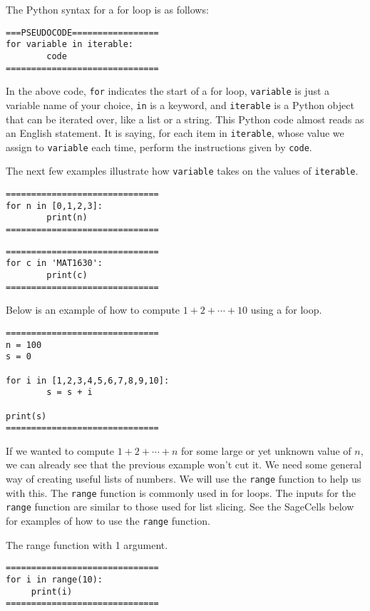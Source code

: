 \documentclass{ximera}
\begin{document}
The Python syntax for a for loop is as follows:

\begin{verbatim}
===PSEUDOCODE=================
for variable in iterable:
        code
==============================
\end{verbatim}

In the above code, \verb|for| indicates the start of a for loop, \verb|variable| is just a variable name of your choice, \verb|in| is a keyword, and \verb|iterable| is a Python object that can be iterated over, like a list or a string. This Python code almost reads as an English statement. It is saying, for each item in \verb|iterable|, whose value we assign to \verb|variable| each time, perform the instructions given by \verb|code|.

The next few examples illustrate how \verb|variable| takes on the values of \verb|iterable|.

\begin{verbatim}
==============================
for n in [0,1,2,3]:
        print(n)
==============================
\end{verbatim}

\begin{verbatim}
==============================
for c in 'MAT1630':
        print(c)
==============================
\end{verbatim}

Below is an example of how to compute $1+2+\cdots+10$ using a for loop.

\begin{verbatim}
==============================
n = 100
s = 0

for i in [1,2,3,4,5,6,7,8,9,10]:
        s = s + i

print(s)
==============================
\end{verbatim}

If we wanted to compute $1+2+\cdots+n$ for some large or yet unknown value of $n$, we can already see that the previous example won't cut it. We need some general way of creating useful lists of numbers. We will use the \verb|range| function to help us with this. The \verb|range| function is commonly used in for loops. The inputs for the \verb|range| function are similar to those used for list slicing. See the SageCells below for examples of how to use the \verb|range| function.

The range function with 1 argument.
\begin{verbatim}
==============================
for i in range(10):
     print(i)
==============================
\end{verbatim}
\end{document}
